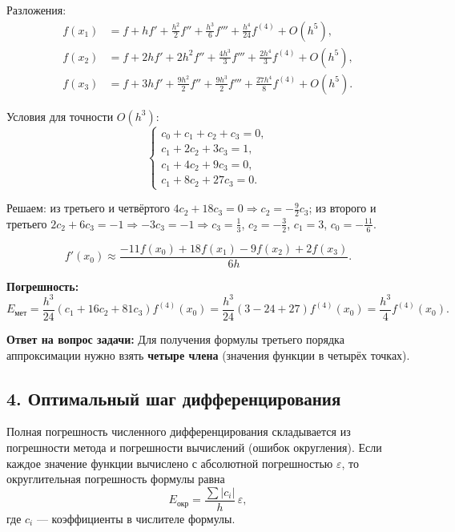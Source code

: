 \documentclass{article}
\begin{document}
Разложения:
\begin{align}
f(x_1) &= f + h f' + \tfrac{h^2}{2} f'' + \tfrac{h^3}{6} f''' + \tfrac{h^4}{24} f^{(4)} + O(h^5), \\
f(x_2) &= f + 2h f' + 2h^2 f'' + \tfrac{4h^3}{3} f''' + \tfrac{2h^4}{3} f^{(4)} + O(h^5), \\
f(x_3) &= f + 3h f' + \tfrac{9h^2}{2} f'' + \tfrac{9h^3}{2} f''' + \tfrac{27h^4}{8} f^{(4)} + O(h^5).
\end{align}

Условия для точности $O(h^3)$:
\begin{equation}
\begin{cases}
c_0 + c_1 + c_2 + c_3 = 0, \\
c_1 + 2c_2 + 3c_3 = 1, \\
c_1 + 4c_2 + 9c_3 = 0, \\
c_1 + 8c_2 + 27c_3 = 0.
\end{cases}
\label{eq:system_3}
\end{equation}

Решаем: из третьего и четвёртого $4c_2 + 18c_3 = 0 \Rightarrow c_2 = -\tfrac{9}{2} c_3$; из второго и третьего $2c_2 + 6c_3 = -1 \Rightarrow -3c_3 = -1 \Rightarrow c_3 = \tfrac{1}{3}$, $c_2 = -\tfrac{3}{2}$, $c_1 = 3$, $c_0 = -\tfrac{11}{6}$.

\begin{equation}
\boxed{f'(x_0) \approx \frac{-11f(x_0) + 18f(x_1) - 9f(x_2) + 2f(x_3)}{6h}.}
\label{eq:forward_3}
\end{equation}

\textbf{Погрешность:}
\begin{equation}
E_{\text{мет}} = \frac{h^3}{24}(c_1 + 16c_2 + 81c_3) f^{(4)}(x_0) = \frac{h^3}{24}(3 - 24 + 27) f^{(4)}(x_0) = \frac{h^3}{4} f^{(4)}(x_0).
\end{equation}

\textbf{Ответ на вопрос задачи:} Для получения формулы третьего порядка аппроксимации нужно взять \textbf{четыре члена} (значения функции в четырёх точках).

\subsection*{4. Оптимальный шаг дифференцирования}

Полная погрешность численного дифференцирования складывается из погрешности метода и погрешности вычислений (ошибок округления). Если каждое значение функции вычислено с абсолютной погрешностью $\varepsilon$, то округлительная погрешность формулы равна
$$
E_{\text{окр}} = \frac{\sum |c_i|}{h}\,\varepsilon,
$$
где $c_i$ --- коэффициенты в числителе формулы.
\end{document}
